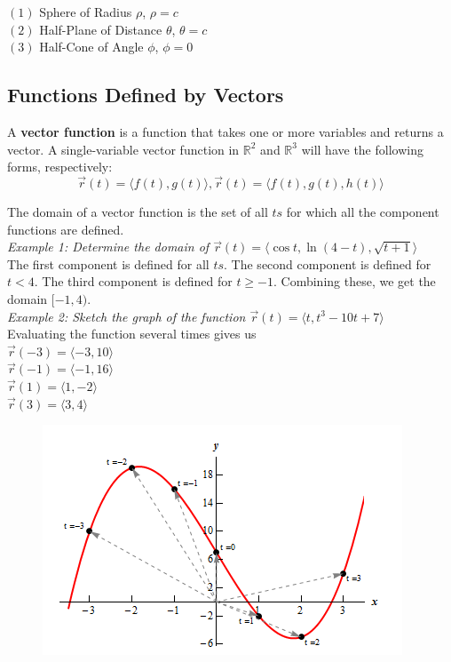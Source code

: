         \noindent $(1)$ Sphere of Radius $\rho$, $\rho=c$ \\
        $(2)$ Half-Plane of Distance $\theta$, $\theta=c$ \\
        $(3)$ Half-Cone of Angle $\phi$, $\phi=0$

    \pagebreak
    \subsection{Functions Defined by Vectors}
        A \textbf{vector function} is a function that takes one or more variables and returns a
        vector. A single-variable vector function in $\mathbb{R}^2$ and $\mathbb{R}^3$ will
        have the following forms, respectively: \\

        \begin{equation*}
            \overrightarrow{r}(t)=\langle f(t), g(t)\rangle
            ,
            \overrightarrow{r}(t)=\langle f(t), g(t), h(t) \rangle
        \end{equation*}

        \noindent The domain of a vector function is the set of all $ts$ for which all the
        component functions are defined. \\

        \noindent \textit{Example 1: Determine the domain of
        $\overrightarrow{r}(t)=\langle \cos t, \ln{(4-t)}, \sqrt{t+1}\rangle$} \\
        The first component is defined for all $ts$. The second component is defined for $t<4$.
        The third component is defined for $t\geq-1$. Combining these, we get the domain $[-1,4)$. \\

        \noindent \textit{Example 2: Sketch the graph of the function
        $\overrightarrow{r}(t)=\langle t,t^3-10t+7\rangle$} \\
        Evaluating the function several times gives us \\
        $\overrightarrow{r}(-3)=\langle -3,10\rangle$ \\
        $\overrightarrow{r}(-1)=\langle -1,16 \rangle$ \\
        $\overrightarrow{r}(1)=\langle 1, -2 \rangle$ \\
        $\overrightarrow{r}(3)=\langle 3,4 \rangle$ \\

        \begin{figure} [hbt!]
            \centering
            \includegraphics[scale=0.6]{Resources/Unit3Vectors/vectorfunction.PNG}
        \end{figure}